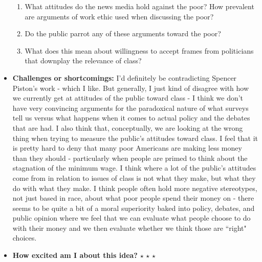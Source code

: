 \documentclass[12pt]{article}
\begin{document}
\begin{itemize}
\begin{enumerate}
            \item What attitudes do the news media hold against the poor? How prevalent are arguments of work ethic used when discussing the poor?
            \item Do the public parrot any of these arguments toward the poor?
            \item What does this mean about willingness to accept frames from politicians that downplay the relevance of class?
        \end{enumerate}
        \item \textbf{Challenges or shortcomings:} I'd definitely be contradicting Spencer Piston's work - which I like. But generally, I just kind of disagree with how we currently get at attitudes of the public toward class - I think we don't have very convincing arguments for the paradoxical nature of what surveys tell us versus what happens when it comes to actual policy and the debates that are had. I also think that, conceptually, we are looking at the wrong thing when trying to measure the public's attitudes toward class. I feel that it is pretty hard to deny that many poor Americans are making less money than they should - particularly when people are primed to think about the stagnation of the minimum wage. I think where a lot of the public's attitudes come from in relation to issues of class is not what they make, but what they do with what they make. I think people often hold more negative stereotypes, not just based in race, about what poor people spend their money on - there seems to be quite a bit of a moral superiority baked into policy, debates, and public opinion where we feel that we can evaluate what people choose to do with their money and we then evaluate whether we think those are ``right" choices.
        \item \textbf{How excited am I about this idea?} $\star$ $\star$ $\star$
    \end{itemize}
\end{document}
